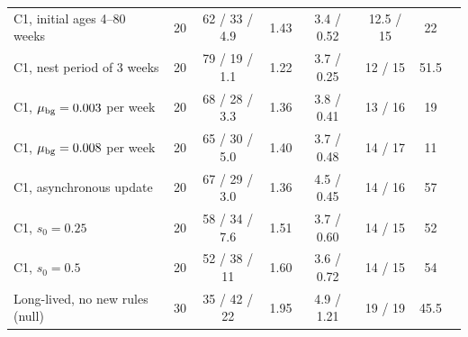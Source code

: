 \begin{table}[t]
{\begin{tabular}{@{}lccccccc@{}}
    \textsf{C1}, initial ages 4--80 weeks & 20 & 62 / 33 / 4.9 & 1.43 & 3.4 / 0.52 & 12.5 / 15 & 22 \\
    \textsf{C1}, nest period of 3 weeks & 20 & 79 / 19 / 1.1 & 1.22 & 3.7 / 0.25 & 12 / 15 & 51.5 \\
    \textsf{C1}, $\mu_{\rm bg}=0.003$ per week & 20 & 68 / 28 / 3.3 & 1.36 & 3.8 / 0.41 & 13 / 16 & 19 \\
    \textsf{C1}, $\mu_{\rm bg}=0.008$ per week & 20 & 65 / 30 / 5.0 & 1.40 & 3.7 / 0.48 & 14 / 17 & 11 \\
    \textsf{C1}, asynchronous update & 20 & 67 / 29 / 3.0 & 1.36 & 4.5 / 0.45 & 14 / 16 & 57 \\
    \textsf{C1}, $s_0=0.25$ & 20 & 58 / 34 / 7.6 & 1.51 & 3.7 / 0.60 & 14 / 15 & 52 \\
    \textsf{C1}, $s_0=0.5$ & 20 & 52 / 38 / 11 & 1.60 & 3.6 / 0.72 & 14 / 15 & 54 \\
    Long-lived, no new rules (null) & 30 & 35 / 42 / 22 & 1.95 & 4.9 / 1.21 & 19 / 19 & 45.5 \\
    \bottomrule
  \end{tabular}}
\end{table}

